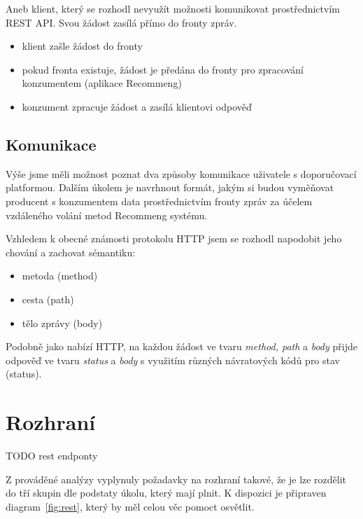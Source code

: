 \documentclass[thesis=M,czech]{FITthesis}[2014/05/07]
\begin{document}
Aneb klient, který se rozhodl nevyužít možnosti komunikovat prostřednictvím REST API. Svou žádost zasílá přímo do fronty zpráv.

\begin{itemize}
	\item klient zašle žádost do fronty
	\item pokud fronta existuje, žádost je předána do fronty pro zpracování konzumentem (aplikace Recommeng)
	\item konzument zpracuje žádost a zasílá klientovi odpověď
\end{itemize}

\subsection{Komunikace}

Výše jsme měli možnost poznat dva způsoby komunikace uživatele s doporučovací platformou. Dalším úkolem je navrhnout formát, jakým si budou vyměňovat producent s konzumentem data prostřednictvím fronty zpráv za účelem vzdáleného volání metod Recommeng systému.

Vzhledem k obecné známosti protokolu HTTP jsem se rozhodl napodobit jeho chování a zachovat sémantiku:

\begin{itemize}
	\item metoda (method)
	\item cesta (path)
	\item tělo zprávy (body)
\end{itemize}

Podobně jako nabízí HTTP, na každou žádost ve tvaru \emph{method, path} a \emph{body} přijde odpověď ve tvaru \emph{status} a \emph{body} s využitím různých návratových kódů pro stav (status).

\section{Rozhraní}

TODO rest endponty

Z prováděné analýzy vyplynuly požadavky na rozhraní takové, že je lze rozdělit do tří skupin dle podstaty úkolu, který mají plnit. K dispozici je připraven diagram~\ref{fig:rest}, který by měl celou věc pomoct osvětlit. 
\end{document}
